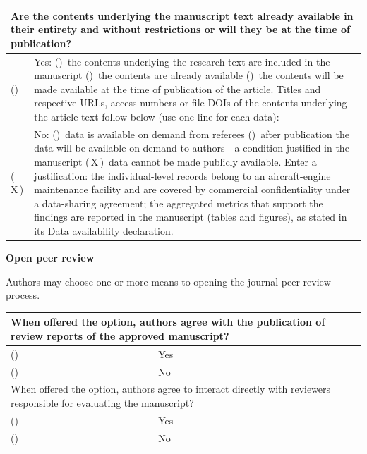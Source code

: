 \documentclass[12pt,a4paper]{article}
\newcommand{\cb}{(\hspace{0.9em})}
\newcommand{\cx}{(\,X\,)}
\begin{document}
\begin{tabularx}{\textwidth}{|p{1.2cm}|X|}
\hline
\multicolumn{2}{|p{15.4cm}|}{Are the contents underlying the manuscript text already available in their entirety and without restrictions or will they be at the time of publication?} \\
\hline
\cb & Yes: \newline
\hspace*{1em}\cb\ the contents underlying the research text are included in the manuscript \newline
\hspace*{1em}\cb\ the contents are already available \newline
\hspace*{1em}\cb\ the contents will be made available at the time of publication of the article. \newline
Titles and respective URLs, access numbers or file DOIs of the contents underlying the article text follow below (use one line for each data): \newline
\\
\hline
\cx & No: \newline
\hspace*{1em}\cb\ data is available on demand from referees \newline
\hspace*{1em}\cb\ after publication the data will be available on demand to authors - a condition justified in the manuscript \newline
\hspace*{1em}\cx\ data cannot be made publicly available. Enter a justification: the individual-level records belong to an aircraft-engine maintenance facility and are covered by commercial confidentiality under a data-sharing agreement; the aggregated metrics that support the findings are reported in the manuscript (tables and figures), as stated in its Data availability declaration. \\
\hline
\end{tabularx}

\textbf{Open peer review}

Authors may choose one or more means to opening the journal peer review process.

\begin{tabularx}{\textwidth}{|p{1.2cm}|X|}
\hline
\multicolumn{2}{|p{15.4cm}|}{When offered the option, authors agree with the publication of review reports of the approved manuscript?} \\
\hline
\cb & Yes \\
\hline
\cb & No \\
\hline
\multicolumn{2}{|p{15.4cm}|}{When offered the option, authors agree to interact directly with reviewers responsible for evaluating the manuscript?} \\
\hline
\cb & Yes \\
\hline
\cb & No \\
\hline
\end{tabularx}
\end{document}
